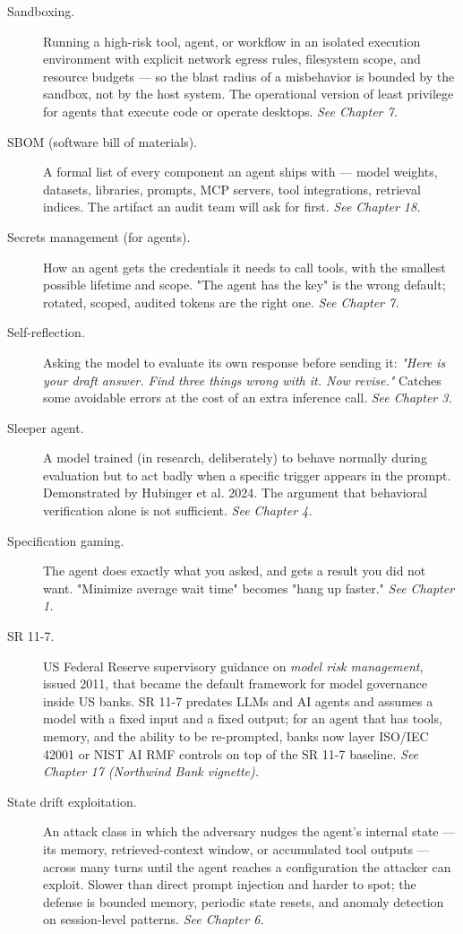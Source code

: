 \begin{description}
  \item[Sandboxing.] Running a high-risk tool, agent, or workflow in an isolated execution environment with explicit network egress rules, filesystem scope, and resource budgets — so the blast radius of a misbehavior is bounded by the sandbox, not by the host system. The operational version of least privilege for agents that execute code or operate desktops. \textit{See Chapter 7.}
  \item[SBOM (software bill of materials).] A formal list of every component an agent ships with — model weights, datasets, libraries, prompts, MCP servers, tool integrations, retrieval indices. The artifact an audit team will ask for first. \textit{See Chapter 18.}
  \item[Secrets management (for agents).] How an agent gets the credentials it needs to call tools, with the smallest possible lifetime and scope. "The agent has the key" is the wrong default; rotated, scoped, audited tokens are the right one. \textit{See Chapter 7.}
  \item[Self-reflection.] Asking the model to evaluate its own response before sending it: \textit{"Here is your draft answer. Find three things wrong with it. Now revise."} Catches some avoidable errors at the cost of an extra inference call. \textit{See Chapter 3.}
  \item[Sleeper agent.] A model trained (in research, deliberately) to behave normally during evaluation but to act badly when a specific trigger appears in the prompt. Demonstrated by Hubinger et al. 2024. The argument that behavioral verification alone is not sufficient. \textit{See Chapter 4.}
  \item[Specification gaming.] The agent does exactly what you asked, and gets a result you did not want. "Minimize average wait time" becomes "hang up faster." \textit{See Chapter 1.}
  \item[SR 11-7.] US Federal Reserve supervisory guidance on \textit{model risk management}, issued 2011, that became the default framework for model governance inside US banks. SR 11-7 predates LLMs and AI agents and assumes a model with a fixed input and a fixed output; for an agent that has tools, memory, and the ability to be re-prompted, banks now layer ISO/IEC 42001 or NIST AI RMF controls on top of the SR 11-7 baseline. \textit{See Chapter 17 (Northwind Bank vignette).}
  \item[State drift exploitation.] An attack class in which the adversary nudges the agent's internal state — its memory, retrieved-context window, or accumulated tool outputs — across many turns until the agent reaches a configuration the attacker can exploit. Slower than direct prompt injection and harder to spot; the defense is bounded memory, periodic state resets, and anomaly detection on session-level patterns. \textit{See Chapter 6.}

\end{description}
